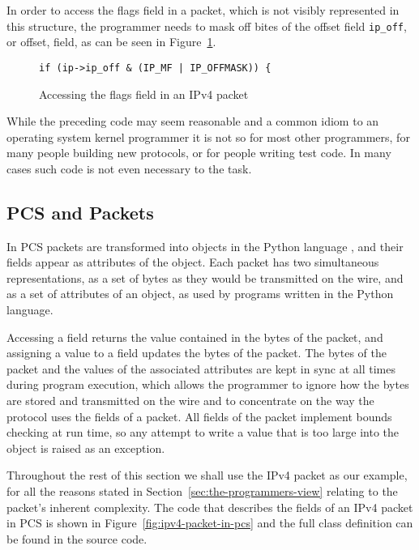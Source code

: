 \documentclass[pdftex]{article}
\begin{document}
In order to access the flags field in a packet, which is not visibly
represented in this structure, the programmer needs to mask off bites
of the offset field \verb|ip_off|, or offset, field, as can be seen in
Figure~\ref{fig:accessing-the-flags-field}.

\begin{figure}
  \centering
\begin{lstlisting}
if (ip->ip_off & (IP_MF | IP_OFFMASK)) {  
\end{lstlisting}
\caption{Accessing the flags field in an IPv4 packet}
  \label{fig:accessing-the-flags-field}
\end{figure}

While the preceding code may seem reasonable and a common idiom to an
operating system kernel programmer it is not so for most other
programmers, for many people building new protocols, or for people
writing test code.  In many cases such code is not even necessary to
the task.

\subsection{PCS and Packets}
\label{sec:pcs-and-packets}

In PCS packets are transformed into objects in the Python language
\cite{vanrossum:pyref}, and their fields appear as attributes of the
object.  Each packet has two simultaneous representations, as a set of
bytes as they would be transmitted on the wire, and as a set of
attributes of an object, as used by programs written in the Python
language.

Accessing a field returns the value contained in the bytes of the
packet, and assigning a value to a field updates the bytes of the
packet.  The bytes of the packet and the values of the associated
attributes are kept in sync at all times during program execution,
which allows the programmer to ignore how the bytes are stored and
transmitted on the wire and to concentrate on the way the protocol
uses the fields of a packet.  All fields of the packet implement
bounds checking at run time, so any attempt to write a value that is
too large into the object is raised as an exception.  

Throughout the rest of this section we shall use the IPv4 packet as
our example, for all the reasons stated in
Section~\ref{sec:the-programmers-view} relating to the packet's
inherent complexity.  The code that describes the fields of an IPv4
packet in PCS is shown in Figure~\ref{fig:ipv4-packet-in-pcs} and the
full class definition can be found in the source code.
\end{document}
